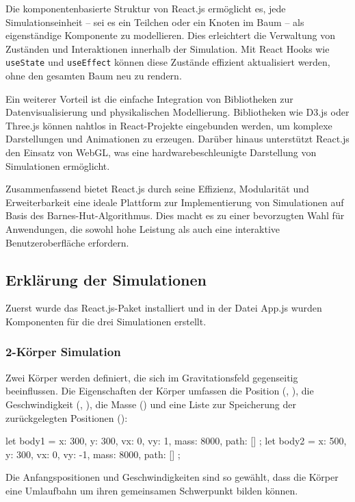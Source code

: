 \documentclass[a4paper,12pt,twoside]{article}
\begin{document}
Die komponentenbasierte Struktur von React.js ermöglicht es, jede Simulationseinheit -- sei es ein Teilchen oder ein Knoten im Baum -- als eigenständige Komponente zu modellieren. Dies erleichtert die Verwaltung von Zuständen und Interaktionen innerhalb der Simulation. Mit React Hooks wie \texttt{useState} und \texttt{useEffect} können diese Zustände effizient aktualisiert werden, ohne den gesamten Baum neu zu rendern.

Ein weiterer Vorteil ist die einfache Integration von Bibliotheken zur Datenvisualisierung und physikalischen Modellierung. Bibliotheken wie D3.js oder Three.js können nahtlos in React-Projekte eingebunden werden, um komplexe Darstellungen und Animationen zu erzeugen. Darüber hinaus unterstützt React.js den Einsatz von WebGL, was eine hardwarebeschleunigte Darstellung von Simulationen ermöglicht.

Zusammenfassend bietet React.js durch seine Effizienz, Modularität und Erweiterbarkeit eine ideale Plattform zur Implementierung von Simulationen auf Basis des Barnes-Hut-Algorithmus. Dies macht es zu einer bevorzugten Wahl für Anwendungen, die sowohl hohe Leistung als auch eine interaktive Benutzeroberfläche erfordern.

\subsection{Erklärung der Simulationen}
Zuerst wurde das React.js-Paket installiert und in der Datei App.js wurden Komponenten für die drei Simulationen erstellt.
\subsubsection{2-Körper Simulation}
Zwei Körper werden definiert, die sich im Gravitationsfeld gegenseitig beeinflussen. Die Eigenschaften der Körper umfassen die Position (, ), die Geschwindigkeit (, ), die Masse () und eine Liste zur Speicherung der zurückgelegten Positionen ():

\begin{javascript}
let body1 = { x: 300, y: 300, vx: 0, vy: 1, mass: 8000, path: [] };
let body2 = { x: 500, y: 300, vx: 0, vy: -1, mass: 8000, path: [] };
\end{javascript}

Die Anfangspositionen und Geschwindigkeiten sind so gewählt, dass die Körper eine Umlaufbahn um ihren gemeinsamen Schwerpunkt bilden können.
\end{document}
